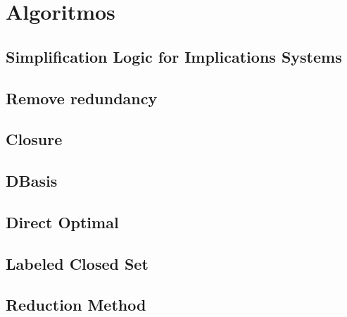 \section{Algoritmos}

\subsection{Simplification Logic for Implications Systems}

 

\subsection{Remove redundancy}

 

\subsection{Closure}

 

\subsection{DBasis}

 

\subsection{Direct Optimal}

 

\subsection{Labeled Closed Set}

 

\subsection{Reduction Method}

 

\newpage
\thispagestyle{empty}
\mbox{}

\newpage